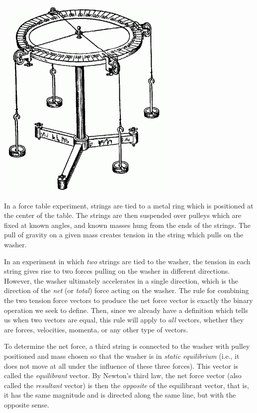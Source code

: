 \documentclass[12pt,letterpaper,reqno]{article}
\numberwithin{equation}{section}
\newcommand{\ti}[1]{\textit{#1}}
\begin{document}
\begin{center}
	\includegraphics[scale=0.5]{figures_mvc/force_table_experiment_2}
\end{center}

In a force table experiment, strings are tied to a metal ring which is positioned at the center of the table. The strings are then suspended over pulleys which are fixed at known angles, and known masses hung from the ends of the strings. The pull of gravity on a given mass creates tension in the string which pulls on the washer. 

In an experiment in which \ti{two} strings are tied to the washer, the tension in each string gives rise to two forces pulling on the washer in different directions. However, the washer ultimately accelerates in a single direction, which is the direction of the \ti{net} (or \ti{total}) force acting on the washer. The rule for combining the two tension force vectors to produce the net force vector is exactly the binary operation we seek to define. Then, since we already have a definition which tells us when two vectors are equal, this rule will apply to \ti{all} vectors, whether they are forces, velocities, momenta, or any other type of vectors. 

To determine the net force, a third string is connected to the washer with pulley positioned and mass chosen so that the washer is in \ti{static equilibrium} (i.e., it does not move at all under the influence of these three forces). This vector is called the \ti{equilibrant} vector. By Newton's third law, the net force vector (also called the \ti{resultant} vector) is then the \ti{opposite} of the equilibrant vector, that is, it has the same magnitude and is directed along the same line, but with the opposite sense.
\end{document}
